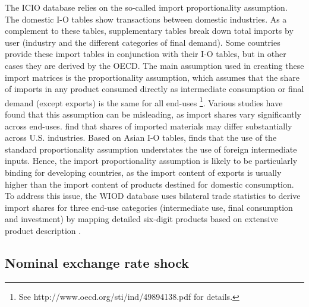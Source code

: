 \documentclass[11pt,a4paper]{article}
\begin{document}
The ICIO database relies on the so-called import proportionality assumption. The domestic I-O tables show transactions between domestic industries. As a complement to these tables, supplementary tables break down total imports by user (industry and the different categories of final demand). Some countries provide these import tables in conjunction with their I-O tables, but in other cases they are derived by the OECD. The main assumption used in creating these import matrices is the proportionality assumption, which assumes that the share of imports in any product consumed directly as intermediate consumption or final demand (except exports) is the same for all end-uses  \footnote{See http://www.oecd.org/sti/ind/49894138.pdf for details.}. Various studies have found that this assumption can be misleading, as import shares vary significantly across end-uses. \cite{FeenstraOffshoringUS2012} find that shares of imported materials may differ substantially across U.S. industries. Based on Asian I-O tables, \cite{Puzzello2012} finds that the use of the standard proportionality assumption understates the use of foreign intermediate inputs. Hence, the import proportionality assumption is likely to be particularly binding for developing countries, as the import content of exports is usually higher than the import content of products destined for domestic consumption. To address this issue, the WIOD database uses bilateral trade statistics to derive import shares for three end-use categories (intermediate use, final consumption and investment) by mapping detailed six-digit products based on extensive product description \citep{ DietzenbacherConstructionWorldInputOutput2013}.

\subsection{Nominal exchange rate shock}
\label{subsec:chocchange}
\end{document}
